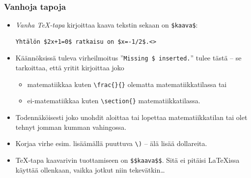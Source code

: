 \begin{frame}[fragile]
    \frametitle{Vanhoja tapoja}

    \begin{itemize}[<+->]
        \item \emph{Vanha \TeX-tapa} kirjoittaa kaava tekstin sekaan on \lstinline-$kaava$-:
            \begin{lstlisting}
Yhtälön $2x+1=0$ ratkaisu on $x=-1/2$.<>
            \end{lstlisting}
        \item Käännöksissä tuleva virheilmoitus ''\texttt{Missing \$ inserted.}'' tulee tästä -- se tarkoittaa, että yritit kirjoittaa joko 
            \begin{itemize}
                \item matematiikkaa kuten \lstinline-\frac{}{}- olematta matematiikkatilassa tai
                \item ei-matematiikkaa kuten \lstinline-\section{}- matematiikkatilassa.
            \end{itemize}

        \item Todennäköisesti joko unohdit aloittaa tai lopettaa matematiikkatilan tai olet tehnyt jomman kumman vahingossa.
        \item Korjaa virhe esim. lisäämällä puuttuva \verb-\)- -- älä lisää dollareita.
        \item \TeX-tapa kaavarivin tuottamiseen on \verb-$$kaava$$-. \alert{Sitä ei pitäisi \LaTeX{}issa käyttää ollenkaan}, vaikka jotkut niin tekevätkin\dots
    \end{itemize}
\end{frame}

